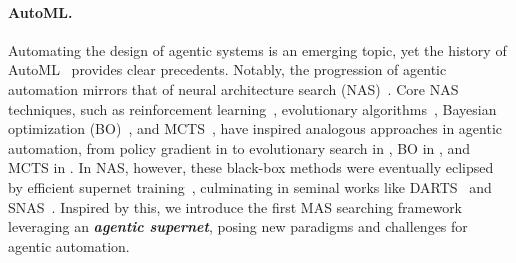 \vspace{-0.6em}
\paragraph{AutoML.} Automating the design of agentic systems is an emerging topic, yet the history of AutoML~\citep{he2021automl} provides clear precedents. Notably, the progression of agentic automation mirrors that of neural architecture search (NAS)~\citep{ren2021comprehensivenas}. Core NAS techniques, such as reinforcement learning~\citep{zoph2016rl-nas}, evolutionary algorithms~\citep{liu2021evo-nas}, Bayesian optimization (BO)~\citep{white2021bananas}, and MCTS~\citep{wang2021mcts-nas}, have inspired analogous approaches in agentic automation, from policy gradient in \citep{zhuge2024gptswarm} to evolutionary search in \citep{yuan2024evoagent}, BO in \citep{shang2024agentsquare}, and MCTS in \citep{zhang2024aflow}. In NAS, however, these black-box methods were eventually eclipsed by efficient supernet training~\citep{white2023nas1k}, culminating in seminal works like DARTS~\citep{liu2018darts} and SNAS~\citep{xie2018snas}. Inspired by this, we introduce the first MAS searching framework leveraging an \textit{\textbf{agentic supernet}}, posing new paradigms and challenges for agentic automation.



\vspace{-0.4em}